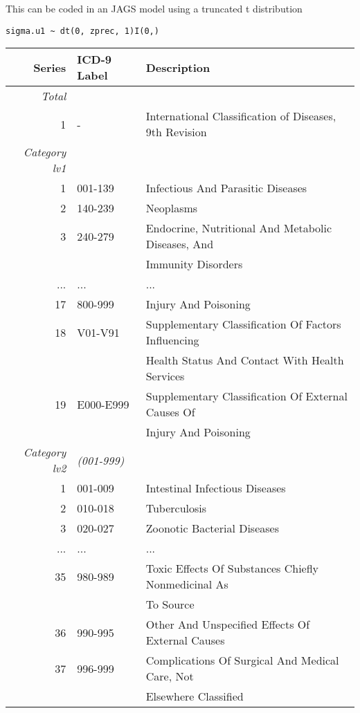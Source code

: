 This can be coded in an JAGS model using a truncated t distribution

\begin{lstlisting}
sigma.u1 ~ dt(0, zprec, 1)I(0,)
\end{lstlisting}

\newpage






\begin{table}[h!]
	\centering
	\begin{tabular}{|rll|} 
		\hline
		\textbf{Series} & \textbf{ICD-9 Label}  & \textbf{Description}\\ [0.5ex] 
		
		\hline\hline
		\textit{Total}&&\\
		
		1 & -  & International Classification of Diseases, 9th Revision \\ 
	
		\hline	
		\textit{Category lv1}&&\\
		
		1 &001-139  &Infectious And Parasitic Diseases\\
		2 &140-239  &Neoplasms\\
		3 &240-279  &Endocrine, Nutritional And Metabolic Diseases, And \\
		&& Immunity Disorders\\
	    ...&...&...\\
		17 &800-999  &Injury And Poisoning\\
	    18 &V01-V91  &Supplementary Classification Of Factors Influencing \\
	    &&Health Status And Contact With Health Services\\
		19 &E000-E999  &Supplementary Classification Of External Causes Of\\
		&& Injury And Poisoning\\
		
		\hline	
		\textit{Category lv2}&\textit{(001-999)}&\\
		
		1 &001-009  &Intestinal Infectious Diseases\\
		2 &010-018  &Tuberculosis\\
		3 &020-027  &Zoonotic Bacterial Diseases\\
		...&...&...\\
		35 &980-989  &Toxic Effects Of Substances Chiefly Nonmedicinal As\\ 
		&&To Source\\
		36 &990-995  &Other And Unspecified Effects Of External Causes\\
		37 &996-999  &Complications Of Surgical And Medical Care, Not \\
		&&Elsewhere Classified\\
		

\end{tabular}
\end{table}
